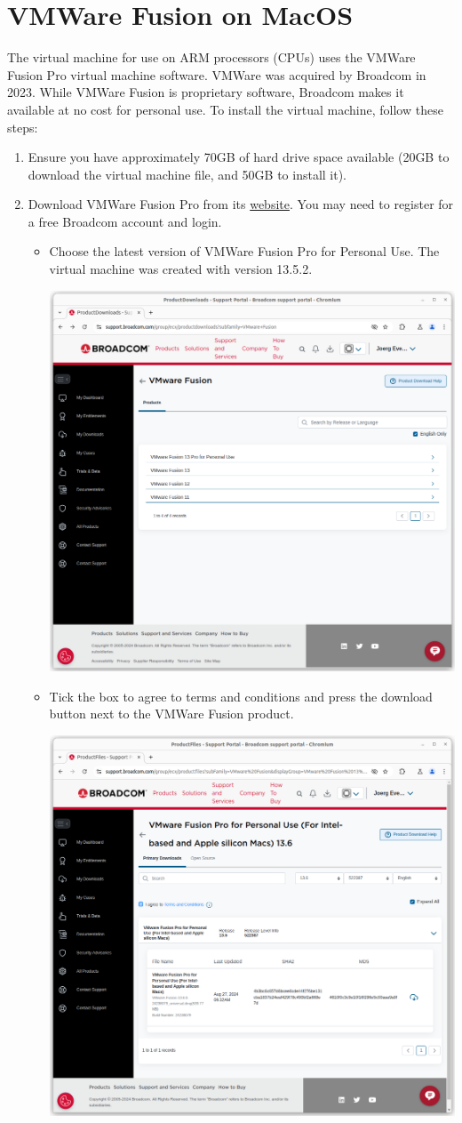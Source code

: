 \section{VMWare Fusion on MacOS}
The virtual machine for use on ARM processors (CPUs) uses the VMWare Fusion Pro virtual machine software. VMWare was acquired by Broadcom in 2023. While VMWare Fusion is proprietary software, Broadcom makes it available at no cost for personal use. To install the virtual machine, follow these steps:

\begin{enumerate}
\item Ensure you have approximately 70GB of hard drive space available (20GB to download the virtual machine file, and 50GB to install it).
\item Download VMWare Fusion Pro from its \href{https://support.broadcom.com/group/ecx/productdownloads?subfamily=VMware+Fusion}{website}. You may need to register for a free Broadcom account and login. 
    \begin{itemize}
       \item Choose the latest version of VMWare Fusion Pro for Personal Use. The virtual machine was created with version 13.5.2.
		  \begin{center}
		  \includegraphics[width=.5\textwidth]{screen28.png}
		  \end{center}
       \item Tick the box to agree to terms and conditions and press the download button next to the VMWare Fusion product.
		  \begin{center}
		  \includegraphics[width=.5\textwidth]{screen27.png}

\end{center}
\end{itemize}
\end{enumerate}

